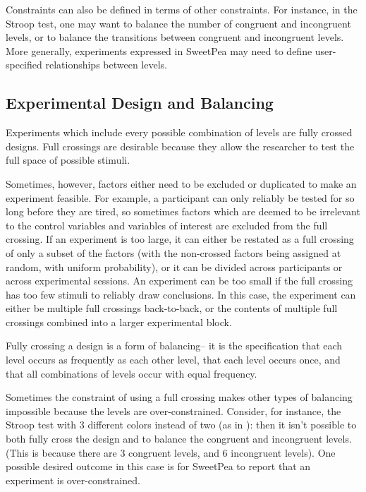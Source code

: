 Constraints can also be defined in terms of other constraints. For instance, in the Stroop test, one may want to balance the number of congruent and incongruent levels, or to balance the transitions between congruent and incongruent levels. More generally, experiments expressed in SweetPea may need to define user-specified relationships between levels.

\subsection{Experimental Design and Balancing}

Experiments which include every possible combination of levels are fully crossed designs. Full crossings are desirable because they allow the researcher to test the full space of possible stimuli.

Sometimes, however, factors either need to be excluded or duplicated to make an experiment feasible. For example, a participant can only reliably be tested for so long before they are tired, so sometimes factors which are deemed to be irrelevant to the control variables and variables of interest are excluded from the full crossing. If an experiment is too large, it can either be restated as a full crossing of only a subset of the factors (with the non-crossed factors being assigned at random, with uniform probability), or it can be divided across participants or across experimental sessions. An experiment can be too small if the full crossing has too few stimuli to reliably draw conclusions. In this case, the experiment can either be multiple full crossings back-to-back, or the contents of multiple full crossings combined into a larger experimental block.

Fully crossing a design is a form of balancing-- it is the specification that each level occurs as frequently as each other level, that each level occurs once, and that all combinations of levels occur with equal frequency.



Sometimes the constraint of using a full crossing makes other types of balancing impossible because the levels are over-constrained. Consider, for instance, the Stroop test with 3 different colors instead of two (as in ): then it isn't possible to both fully cross the design and to balance the congruent and incongruent levels. (This is because there are 3 congruent levels, and 6 incongruent levels). One possible desired outcome in this case is for SweetPea to report that an experiment is over-constrained.

